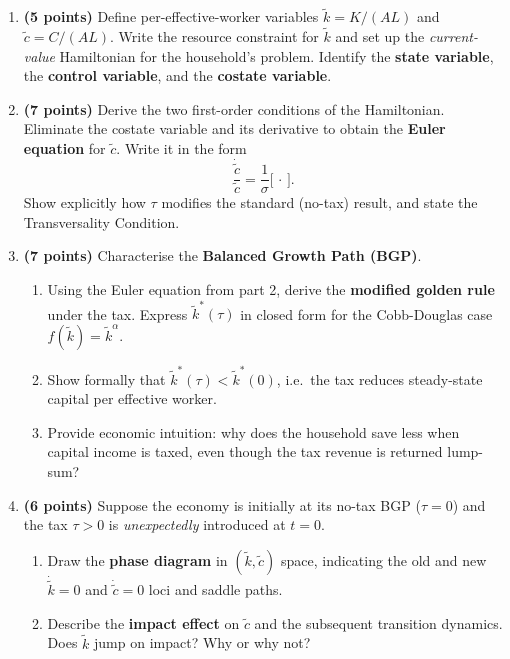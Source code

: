 \documentclass[a4paper,11pt]{article}
\newcommand{\ktilde}{\tilde{k}}
\newcommand{\ctilde}{\tilde{c}}
\begin{document}
\begin{enumerate}[label=\textbf{\arabic*.}, leftmargin=*, itemsep=6pt]

    \item \textbf{(5 points)} Define per-effective-worker variables
    $\ktilde = K/(AL)$ and $\ctilde = C/(AL)$.  Write the resource constraint for
    $\ktilde$ and set up the \emph{current-value} Hamiltonian for the household's problem.
    Identify the \textbf{state variable}, the \textbf{control variable}, and the
    \textbf{costate variable}.

    \item \textbf{(7 points)} Derive the two first-order conditions of the Hamiltonian.
    Eliminate the costate variable and its derivative to obtain the
    \textbf{Euler equation} for $\ctilde$.  Write it in the form
    \[
        \frac{\dot{\ctilde}}{\ctilde} = \frac{1}{\sigma}\bigl[\,\cdot\,\bigr].
    \]
    Show explicitly how $\tau$ modifies the standard (no-tax) result, and state the
    Transversality Condition.

    \item \textbf{(7 points)} Characterise the \textbf{Balanced Growth Path (BGP)}.
    \begin{enumerate}[label=(\alph*), itemsep=4pt]
        \item Using the Euler equation from part 2, derive the \textbf{modified golden rule}
        under the tax.  Express $\ktilde^*(\tau)$ in closed form for the Cobb-Douglas case
        $f(\ktilde) = \ktilde^{\alpha}$.
        \item Show formally that $\ktilde^*(\tau) < \ktilde^*(0)$, i.e.\ the tax reduces
        steady-state capital per effective worker.
        \item Provide economic intuition: why does the household save less when capital
        income is taxed, even though the tax revenue is returned lump-sum?
    \end{enumerate}

    \item \textbf{(6 points)} Suppose the economy is initially at its no-tax BGP
    ($\tau = 0$) and the tax $\tau > 0$ is \emph{unexpectedly} introduced at $t=0$.
    \begin{enumerate}[label=(\alph*), itemsep=4pt]
        \item Draw the \textbf{phase diagram} in $(\ktilde,\ctilde)$ space, indicating the
        old and new $\dot{\ktilde}=0$ and $\dot{\ctilde}=0$ loci and saddle paths.
        \item Describe the \textbf{impact effect} on $\ctilde$ and the subsequent
        transition dynamics.  Does $\ktilde$ jump on impact?  Why or why not?
    \end{enumerate}

\end{enumerate}
\end{document}
